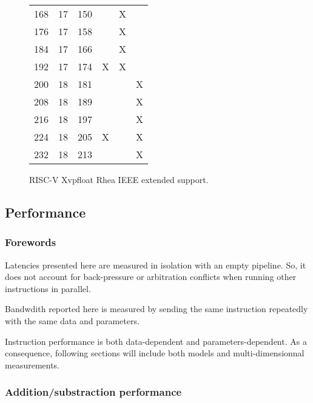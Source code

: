 \begin{figure}[ht]
\begin{center}
\begin{tabular}{|l|l|l|l|l|l|}
    168         & 17 & 150 &             & X                 &                    \\
    176         & 17 & 158 &             & X                 &                    \\
    184         & 17 & 166 &             & X                 &                    \\
    192         & 17 & 174 & X           & X                 &                    \\
    200         & 18 & 181 &             &                   & X                  \\
    208         & 18 & 189 &             &                   & X                  \\
    216         & 18 & 197 &             &                   & X                  \\
    224         & 18 & 205 & X           &                   & X                  \\
    232         & 18 & 213 &             &                   & X                  \\
    \hline
    \end{tabular}
\end{center}
\caption{RISC-V Xvpfloat Rhea IEEE extended support.}
\label{fig:Xvpfloat_rhea_ieee_extended}
\end{figure}

\subsection{Performance}

\subsubsection{Forewords}

Latencies presented here are measured in isolation with an empty pipeline.
So, it does not account for back-pressure or arbitration conflicts when running other instructions in parallel.

Bandwdith reported here is measured by sending the same instruction repeatedly with the same data and parameters.

Instruction performance is both data-dependent and parameters-dependent.
As a consequence, following sections will include both models and multi-dimensionnal measurements.

\subsubsection{Addition/substraction performance}

